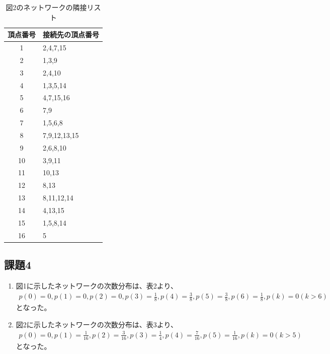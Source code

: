 \documentclass[12pt]{jarticle}
\begin{document}
\begin{table}[htb]
    \caption{図2のネットワークの隣接リスト}
    \begin{center}
        \begin{tabular}{|c|l|}
            \hline
            頂点番号 & 接続先の頂点番号 \\ \hline \hline
            1        & 2,4,7,15         \\ \hline
            2        & 1,3,9            \\ \hline
            3        & 2,4,10           \\ \hline
            4        & 1,3,5,14         \\ \hline
            5        & 4,7,15,16        \\ \hline
            6        & 7,9              \\ \hline
            7        & 1,5,6,8          \\ \hline
            8        & 7,9,12,13,15     \\ \hline
            9        & 2,6,8,10         \\ \hline
            10       & 3,9,11           \\ \hline
            11       & 10,13            \\ \hline
            12       & 8,13             \\ \hline
            13       & 8,11,12,14       \\ \hline
            14       & 4,13,15          \\ \hline
            15       & 1,5,8,14         \\ \hline
            16       & 5                \\ \hline
        \end{tabular}
    \end{center}
\end{table}

\subsection{課題4}
\begin{enumerate}
    \item 図1に示したネットワークの次数分布は、表2より、
          \begin{eqnarray*}
              p(0)=0, p(1)=0, p(2)=0, p(3)=\frac{1}{8}, p(4)=\frac{3}{8}, p(5)=\frac{3}{8}, p(6)=\frac{1}{8}, p(k)=0(k>6)
          \end{eqnarray*}
          となった。
    \item 図2に示したネットワークの次数分布は、表3より、
          \begin{eqnarray*}
              p(0)=0, p(1)=\frac{1}{16}, p(2)=\frac{3}{16}, p(3)=\frac{1}{4}, p(4)=\frac{7}{16}, p(5)=\frac{1}{16}, p(k)=0(k>5)
          \end{eqnarray*}
          となった。
\end{enumerate}
\end{document}

